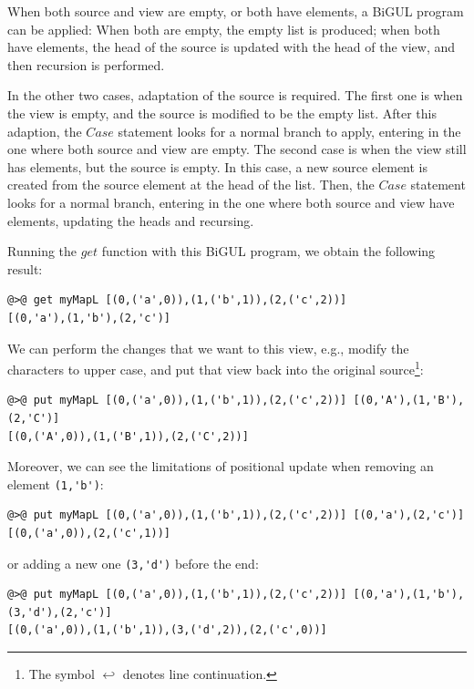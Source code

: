 \documentclass[numbers]{sigplanconf}
\newcommand{\Conid}[1]{\mathit{#1}}
\newcommand{\Varid}[1]{\mathit{#1}}
\newcommand{\lstcontinueline}{\ensuremath{\hookleftarrow}}
\begin{document}

When both source and view are empty, or both have elements, a BiGUL program can
be applied: When both are empty, the empty list is produced;
when both have elements, the head of the source is updated with the head of the
view, and then recursion is performed.

In the other two cases, adaptation of the source is required. The first one is
when the view is empty, and the source is modified to be the empty list. After
this adaption, the \ensuremath{\Conid{Case}} statement looks for a normal branch to apply, entering
in the one where both source and view are empty. The second case is when the
view still has elements, but the source is empty. In this case, a new source
element is created from the source element at the head of the list. Then, the
\ensuremath{\Conid{Case}} statement looks for a normal branch, entering in the one where both
source and view have elements, updating the heads and recursing.

Running the \ensuremath{\Varid{get}} function with this BiGUL program, we obtain the following
result:
%
\begin{lstlisting}
@>@ get myMapL [(0,('a',0)),(1,('b',1)),(2,('c',2))]
[(0,'a'),(1,'b'),(2,'c')]
\end{lstlisting}
%
We can perform the changes that we want to this view, e.g., modify the characters
to upper case, and put that view back into the original source\footnote{The
symbol \lstcontinueline{} denotes line continuation.}:
%
\begin{lstlisting}
@>@ put myMapL [(0,('a',0)),(1,('b',1)),(2,('c',2))] [(0,'A'),(1,'B'),(2,'C')]
[(0,('A',0)),(1,('B',1)),(2,('C',2))]
\end{lstlisting}
%
Moreover, we can see the limitations of positional update when removing an
element \lstinline!(1,'b')!:
%
\begin{lstlisting}
@>@ put myMapL [(0,('a',0)),(1,('b',1)),(2,('c',2))] [(0,'a'),(2,'c')]
[(0,('a',0)),(2,('c',1))]
\end{lstlisting}
%
or adding a new one \lstinline!(3,'d')! before the end:
%
\begin{lstlisting}
@>@ put myMapL [(0,('a',0)),(1,('b',1)),(2,('c',2))] [(0,'a'),(1,'b'),(3,'d'),(2,'c')]
[(0,('a',0)),(1,('b',1)),(3,('d',2)),(2,('c',0))]
\end{lstlisting}
\end{document}
